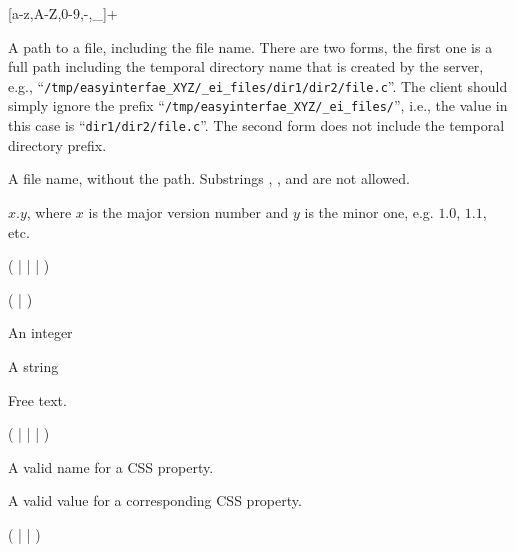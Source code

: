 \bigskip
\noindent
{}

 [a-z,A-Z,0-9,-,\_]+

\bigskip
\noindent
{}


A path to a file, including the file name. There are two forms, the
first one is a full path including the temporal directory name that is
created by the server, e.g.,
``\texttt{/tmp/easyinterfae\_XYZ/\_ei\_files/dir1/dir2/file.c}''.  The
client should simply ignore the prefix
``\texttt{/tmp/easyinterfae\_XYZ/\_ei\_files/}'', i.e., the value in
this case is ``\texttt{dir1/dir2/file.c}''.  The second form does not
include the temporal directory prefix.

\bigskip
\noindent
{} 

A file name, without the path. Substrings , , and
 are not allowed.


\bigskip
\noindent
{}

$x.y$, where $x$ is the major version number and $y$ is the minor one,
e.g. $1.0$, $1.1$, etc.

\bigskip
\noindent
{}

(  |  |  |  )

\bigskip
\noindent
{}

(  |  )

\bigskip
\noindent
{}

An integer

\bigskip
\noindent
{}

A string

\bigskip
\noindent
{}

Free text.

\bigskip
\noindent
{}

(  |  |  |  )

\bigskip
\noindent
{}

A valid name for a CSS property.

\bigskip
\noindent
{}

A valid value for a corresponding CSS property.

\bigskip
\noindent
{}

(  |  |  )



